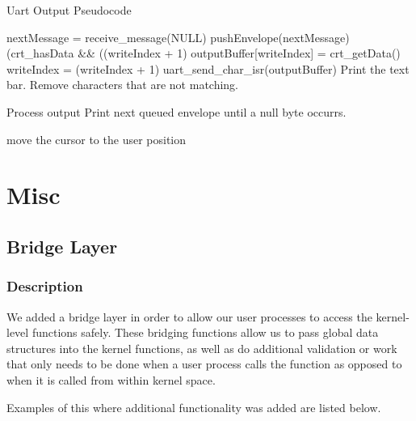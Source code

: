 \documentclass[12pt]{report}
\begin{document}
    \begin{algorithm}
        \caption{Uart Output Pseudocode}
        \label{code:uart_output}
        \begin{algorithmic}[1]
                \Loop
                    \State nextMessage = receive\_message(NULL)
                    \State pushEnvelope(nextMessage)
                    \While(crt\_hasData \&\& ((writeIndex + 1) %
                        \State outputBuffer[writeIndex] = crt\_getData()
                        \State writeIndex = (writeIndex + 1) %
                    \EndWhile
                    \State uart\_send\_char\_isr(outputBuffer)
                \EndLoop
            \EndFunction
                \State Print the text bar. Remove characters that are not matching.

                \State Process output
                    \State Print next queued envelope until a null byte occurrs.
                \EndWhile

                \State move the cursor to the user position
            \EndFunction
        \end{algorithmic}
    \end{algorithm}



\chapter{Misc}

\section{Bridge Layer}

\subsection{Description}
    We added a bridge layer in order to allow our user processes to access the
    kernel-level functions safely.  These bridging functions allow us to pass
    global data structures into the kernel functions, as well as do additional
    validation or work that only needs to be done when a user process calls the
    function as opposed to when it is called from within kernel space.

    Examples of this where additional functionality was added are listed below.
\end{document}
